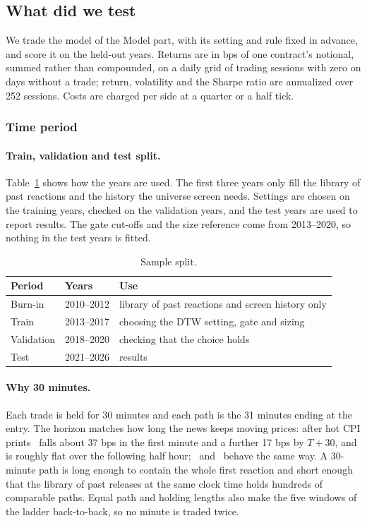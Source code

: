 
\subsection{What did we test}\label{sec:whattest}

We trade the model of the Model part, with its setting and rule fixed in advance, and score it on
the held-out years. Returns are in bps of one contract's notional, summed rather than compounded,
on a daily grid of trading sessions with zero on days without a trade; return, volatility and
the Sharpe ratio are annualized over 252 sessions. Costs are charged per side at a quarter or a
half tick.

\subsubsection{Time period}

\paragraph{Train, validation and test split.} Table~\ref{tab:split} shows how the years are used.
The first three years only fill the library of past reactions and the history the universe
screen needs. Settings are chosen on the training years, checked on the validation years, and
the test years are used to report results. The gate cut-offs and the size reference come from
2013--2020, so nothing in the test years is fitted.

\begin{table}[!tb]
  \centering\footnotesize
  \caption{Sample split.}\label{tab:split}
  \begin{tabular}{lll}
    \toprule
    Period & Years & Use \\
    \midrule
    Burn-in    & 2010--2012 & library of past reactions and screen history only \\
    Train      & 2013--2017 & choosing the DTW setting, gate and sizing \\
    Validation & 2018--2020 & checking that the choice holds \\
    Test       & 2021--2026 & results \\
    \bottomrule
  \end{tabular}
\end{table}

\paragraph{Why 30 minutes.} Each trade is held for 30 minutes and each path is the 31 minutes
ending at the entry. The horizon matches how long the news keeps moving prices: after hot CPI
prints \ES\ falls about 37 bps in the first minute and a further 17 bps by $T+30$, and is roughly
flat over the following half hour; \NQ\ and \YM\ behave the same way. A 30-minute path is long
enough to contain the whole first reaction and short enough that the library of past releases at
the same clock time holds hundreds of comparable paths. Equal path and holding lengths also make
the five windows of the ladder back-to-back, so no minute is traded twice.

